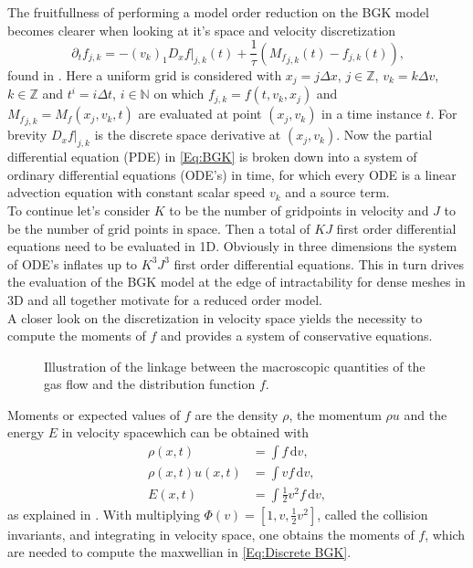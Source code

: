 The fruitfullness of performing a model order reduction on the BGK model becomes clearer when looking at it's space and velocity discretization
\begin{equation}
	\partial_t f_{j,k} = -(v_k)_1D_x f|_{j,k}(t) + \frac{1}{\tau}({M_f}_{j,k}(t) - f_{j,k}(t)) \text{,}
	\label{Eq:Discrete BGK}
\end{equation}
found in \cite{puppo2019kinetic}. Here a uniform grid is considered with \(x_j = j\Delta x\), \(j \in \mathbb{Z}\), \(v_k = k\Delta v\), \(k \in \mathbb{Z}\) and \(t^i = i \Delta t\), \(i \in \mathbb{N}\) on which \(f_{j,k} = f(t,v_k,x_j)\) and \({M_f}_{j,k} = M_f(x_j,v_k,t)\) are evaluated at point \((x_j,v_k)\) in a time instance \(t\). For brevity \(D_x f|_{j,k}\) is the discrete space derivative at \((x_j,v_k)\). Now the partial differential equation (PDE) in \cref{Eq:BGK} is broken down into a system of ordinary differential equations (ODE's) in time, for which every ODE is a linear advection equation with constant scalar speed \(v_k\) and a source term.\\
To continue let's consider \(K\) to be the number of gridpoints in velocity and \(J\) to be the number of grid points in space. Then a total of \(KJ\) first order differential equations need to be evaluated in 1D. Obviously in three dimensions the system of ODE's inflates up to \(K^3J^3\) first order differential equations. This in turn drives the evaluation of the BGK model at the edge of intractability for dense meshes in 3D and all together motivate for a reduced order model.\\
A closer look on the discretization in velocity space yields the necessity to compute the moments of \(f\) and provides a system of conservative equations.\\  
\begin{wrapfigure}{r}{0.5\textwidth}
	\vspace{-10pt}
	\scalebox{.9}{}
	\caption{Illustration of the linkage between the macroscopic quantities of the gas flow and the distribution function \(f\).}
	\vspace{-70pt}
	\label{Fig:Demo Macro}
\end{wrapfigure}
Moments or expected values of \(f\) are the density \(\rho\), the momentum \(\rho u\) and the energy \(E\) in velocity spacewhich can be obtained with
	\begin{align} 
	\rho(x,t) &= \int\! f \,\mathrm{d}v  \mathrm{,}\label{Eq:Moments1}\\
	\rho(x,t) u(x,t) &= \int\! v f \,\mathrm{d}v \mathrm{,}\label{Eq:Moments2}\\
	E(x,t) &= \int\! \frac{1}{2}v^2 f  \,\mathrm{d}v \mathrm{,}\label{Eq:Moments3}
	\end{align}
as explained in  \cite{puppo2019kinetic}. With multiplying \(\Phi(v) = [1,v,\frac{1}{2} v^2]\), called the collision invariants, and integrating in velocity space, one obtains the moments of \(f\), which are needed to compute the maxwellian in \cref{Eq:Discrete BGK}.\\

